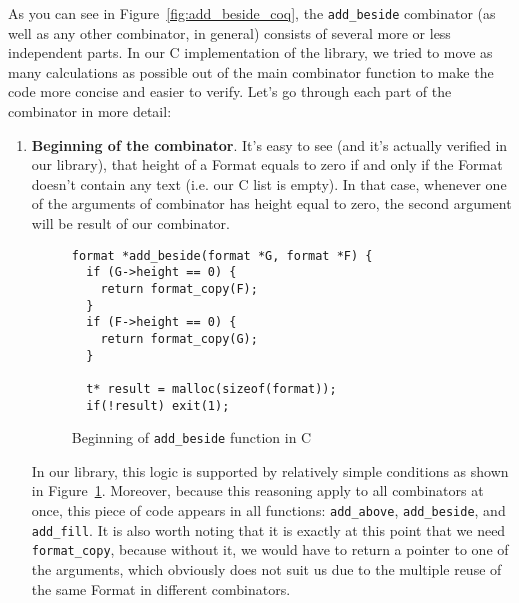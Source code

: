 \documentclass[14pt]{constructor-diploma}
\begin{document}
As you can see in Figure~\ref{fig:add_beside_coq}, the \texttt{add\_beside} combinator (as well as any other combinator, in general) 
consists of several more or less independent parts. In our C implementation of the library, we tried to move as many calculations as possible 
out of the main combinator function to make the code more concise and easier to verify. Let's go through each part of the combinator in more detail:
\begin{enumerate}
  \item \textbf{Beginning of the combinator}. It's easy to see (and it's actually verified in our library), that height of a Format equals to zero if and only if
  the Format doesn't contain any text (i.e. our C list is empty). In that case, whenever one of the arguments of combinator has height
  equal to zero, the second argument will be result of our combinator. 
\begin{figure}[H]
\begin{mdframed}[backgroundcolor=bg]
\begin{verbatim}
format *add_beside(format *G, format *F) {
  if (G->height == 0) {
    return format_copy(F);
  } 
  if (F->height == 0) {
    return format_copy(G);
  }

  t* result = malloc(sizeof(format));
  if(!result) exit(1);
\end{verbatim}
\end{mdframed}
\caption{Beginning of \texttt{add\_beside} function in C}
\label{fig:zero_height_check}
\end{figure}

  In our library, this logic is supported by relatively simple conditions
  as shown in Figure~\ref{fig:zero_height_check}.
  Moreover, because this reasoning apply to all combinators at once, this piece of code appears in all functions: \texttt{add\_above}, \texttt{add\_beside}, and \texttt{add\_fill}. 
  It is also worth noting that it is exactly at this point that we need \texttt{format\_copy}, because without it, 
  we would have to return a pointer to one of the arguments, which obviously does not suit us due to the multiple reuse of the same Format in different combinators.


\end{enumerate}
\end{document}
